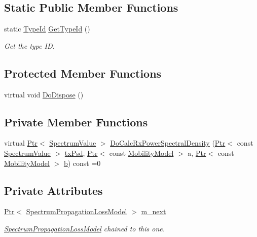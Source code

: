\subsection*{Static Public Member Functions}
\begin{DoxyCompactItemize}
\item 
static \hyperlink{classns3_1_1TypeId}{Type\+Id} \hyperlink{classns3_1_1SpectrumPropagationLossModel_aa22055f3583ded707eda9284290a4c75}{Get\+Type\+Id} ()
\begin{DoxyCompactList}\small\item\em Get the type ID. \end{DoxyCompactList}\end{DoxyCompactItemize}
\subsection*{Protected Member Functions}
\begin{DoxyCompactItemize}
\item 
virtual void \hyperlink{classns3_1_1SpectrumPropagationLossModel_a26259057c97ea893d472b5ac52d6649e}{Do\+Dispose} ()
\end{DoxyCompactItemize}
\subsection*{Private Member Functions}
\begin{DoxyCompactItemize}
\item 
virtual \hyperlink{classns3_1_1Ptr}{Ptr}$<$ \hyperlink{classns3_1_1SpectrumValue}{Spectrum\+Value} $>$ \hyperlink{classns3_1_1SpectrumPropagationLossModel_a84c0da581e8828ee013fe164a899e5c9}{Do\+Calc\+Rx\+Power\+Spectral\+Density} (\hyperlink{classns3_1_1Ptr}{Ptr}$<$ const \hyperlink{classns3_1_1SpectrumValue}{Spectrum\+Value} $>$ \hyperlink{lte__link__budget__x2__handover__measures_8m_a684fe3101a5e48a5fcc57cab8dbcd1aa}{tx\+Psd}, \hyperlink{classns3_1_1Ptr}{Ptr}$<$ const \hyperlink{classns3_1_1MobilityModel}{Mobility\+Model} $>$ a, \hyperlink{classns3_1_1Ptr}{Ptr}$<$ const \hyperlink{classns3_1_1MobilityModel}{Mobility\+Model} $>$ \hyperlink{lte__pathloss_8m_a21ad0bd836b90d08f4cf640b4c298e7c}{b}) const =0
\end{DoxyCompactItemize}
\subsection*{Private Attributes}
\begin{DoxyCompactItemize}
\item 
\hyperlink{classns3_1_1Ptr}{Ptr}$<$ \hyperlink{classns3_1_1SpectrumPropagationLossModel}{Spectrum\+Propagation\+Loss\+Model} $>$ \hyperlink{classns3_1_1SpectrumPropagationLossModel_a890bb05ba16564f1fb885359f06d2583}{m\+\_\+next}
\begin{DoxyCompactList}\small\item\em \hyperlink{classns3_1_1SpectrumPropagationLossModel}{Spectrum\+Propagation\+Loss\+Model} chained to this one. \end{DoxyCompactList}\end{DoxyCompactItemize}
